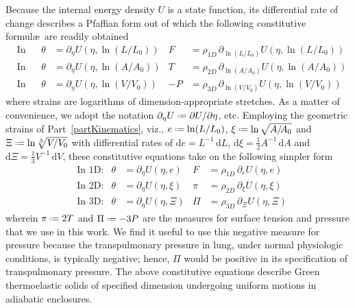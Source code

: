 Because the internal energy density $U$ is a state function, its differential rate of change describes a Pfaffian form \cite{Caratheodory09} out of which the following constitutive formul\ae\ are readily obtained
\begin{subequations}
    \label{GreenElasticCEs}
    \begin{align}
    \mbox{} & \text{In 1D:} & 
    \theta & = \partial_{\eta} U ( \eta , \ln (L/L_0)) &
    F & = \rho_{1D} \, \partial_{\ln(L/L_0)} U ( \eta , \ln (L/L_0) ) \\
    \mbox{} & \text{In 2D:} &
    \theta & = \partial_{\eta} U ( \eta , \ln (A / \! A_0) ) &
    T & = \rho_{2D} \, \partial_{\ln (A / \! A_0)} U ( \eta , \ln (A / A_0) ) \\
    \mbox{} & \text{In 3D:} &
    \theta & = \partial_{\eta} U ( \eta , \ln (V \! / V_0) ) &
    -P & = \rho_{3D} \, \partial_{\ln (V \! / V_0)} U ( \eta , \ln (V \! / V_0) )
    \end{align}
\end{subequations}
where strains are logarithms of dimension-appropriate stretches.  As a matter of convenience, we adopt the notation $\partial_{\eta} U \defeq \partial U / \partial \eta$, etc.  Employing the geometric strains of Part~\ref{partKinematics}, viz., $e \defeq \ln ( L / L_0 )$, $\xi \defeq \ln \sqrt{ A / \! A_0 }$ and $\Xi \defeq \ln \sqrt[3]{V \! / V_0}$ with differential rates of $\mathrm{d} e = L^{-1} \, \mathrm{d}L$, $\mathrm{d} \xi = \tfrac{1}{2} A^{-1} \, \mathrm{d}A$ and $\mathrm{d} \Xi = \tfrac{1}{3} V^{-1} \, \mathrm{d}V$, these constitutive equations take on the following simpler form
\begin{subequations}
    \label{uniformCEs}
    \begin{align}
    \mbox{} & \text{In 1D:} & 
    \theta & = \partial_{\eta} U ( \eta , e) &
    F & = \rho_{1D} \, \partial_e U ( \eta , e ) \\
    \mbox{} & \text{In 2D:} &
    \theta & = \partial_{\eta} U ( \eta , \xi ) &
    \pi & = \rho_{2D} \, \partial_{\xi} U ( \eta , \xi ) \\
    \mbox{} & \text{In 3D:} &
    \theta & = \partial_{\eta} U ( \eta , \Xi ) &
    \Pi & = \rho_{3D} \, \partial_{\Xi} U ( \eta , \Xi )
    \end{align}
\end{subequations}
wherein $\pi \defeq 2T$ and $\Pi \defeq -3P$ are the measures for surface tension and pressure that we use in this work.  We find it useful to use this negative measure for pressure because the transpulmonary pressure in lung, under normal physiologic conditions, is typically negative; hence, $\Pi$ would be positive in its specification of transpulmonary pressure.  The above constitutive equations describe Green thermo\-elastic solids of specified dimension undergoing uniform motions in adiabatic enclosures.


